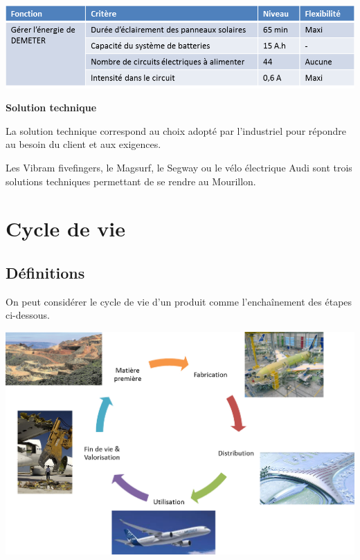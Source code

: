 \documentclass[11pt,oneside]{article}
\begin{document}
\begin{exemple}
\begin{center}
\includegraphics[width=.75\textwidth]{png/cdc_demeter}
\end{center}
\end{exemple}




\begin{defi}
\textbf{Solution technique}

La solution technique correspond au choix adopté par l'industriel pour répondre au besoin du client et aux exigences. 

\end{defi}

\begin{exemple}
Les Vibram fivefingers, le Magsurf, le Segway ou le vélo électrique Audi sont trois solutions techniques permettant de se rendre au Mourillon.
\end{exemple}


\section{Cycle de vie}
\subsection{Définitions}

On peut considérer le cycle de vie d'un produit comme l'enchaînement des étapes ci-dessous. 
\begin{center}
\includegraphics[width=.8\textwidth]{png/cycle_vie}
\end{center}
\end{document}
